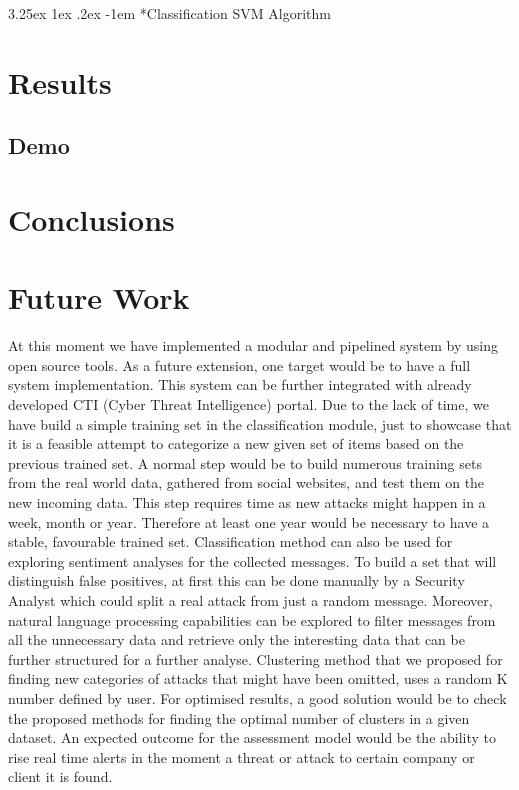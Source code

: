 \documentclass[12pt]{article}
\makeatletter
\renewcommand\paragraph{\@startsection{paragraph}{5}{\z@}%
  {3.25ex \@plus1ex \@minus.2ex}%
  {-1em}%
  {\normalfont\normalsize\bfseries}}
\makeatother
\begin{document}
\paragraph*{Classification}
SVM Algorithm 
\section{Results}
\subsection{Demo}
\section{Conclusions}
\newpage
\section{Future Work}

At this moment we have implemented a modular and pipelined system by using open source tools. As a future extension, one target would be to have a full system implementation. This system can be further integrated with already developed CTI (Cyber Threat Intelligence) portal. Due to the lack of time, we have build a simple training set in the classification module, just to showcase that it is a feasible attempt to categorize a new given set of items based on the previous trained set. A normal step would be to build numerous training sets from the real world data, gathered from social websites, and test them on the new incoming data. This step requires time as new attacks might happen in a week, month or year. Therefore at least one year would be necessary to have a stable, favourable trained set. Classification method can also be used for exploring sentiment analyses for the collected messages. To build a set that will distinguish false positives, at first this can be done manually by a Security Analyst which could split a real attack from just a random message. Moreover, natural language processing capabilities can be explored to filter messages from all the unnecessary data and retrieve only the interesting data that can be further structured for a further analyse. Clustering method that we proposed for finding new categories of attacks that might have been omitted, uses a random K number defined by user. For optimised results, a good solution would be to check the proposed methods for finding the optimal number of clusters in a given dataset. An expected outcome for the assessment model would be the ability to rise real time alerts in the moment a threat or attack to certain company or client it is found.
\end{document}
